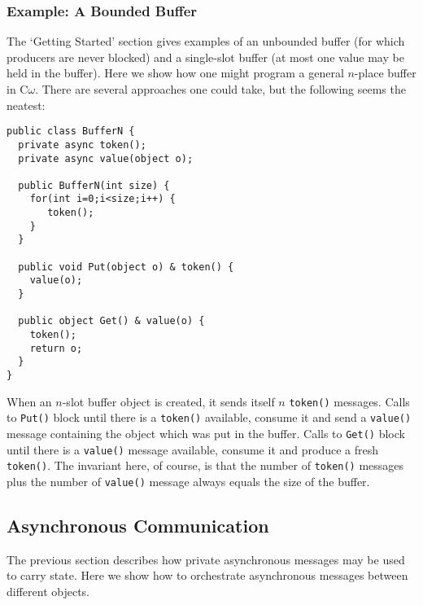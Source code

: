 \documentclass{article}
\newcommand{\comega}{\mbox{C$\omega$}}
\begin{document}
\subsubsection{Example: A Bounded Buffer}
The `Getting Started' section gives examples of an unbounded buffer
(for which producers are never blocked) and a single-slot buffer (at
most one value may be held in the buffer). Here we show how one might
program a general $n$-place buffer in \comega. There are several
approaches one could take, but the following seems the neatest:
\begin{verbatim}
public class BufferN {
  private async token();
  private async value(object o);

  public BufferN(int size) {
    for(int i=0;i<size;i++) {
       token();
    }
  }

  public void Put(object o) & token() {
    value(o);
  }

  public object Get() & value(o) {
    token();
    return o;
  }
}
\end{verbatim}
When an $n$-slot buffer object is created, it sends itself $n$
\verb|token()| messages. Calls to \verb|Put()| block until there is a
\verb|token()| available, consume it and send a \verb|value()| message
containing the object which was put in the buffer. Calls to
\verb|Get()| block until there is a \verb|value()| message available,
consume it and produce a fresh \verb|token()|. The invariant here, of
course, is that the number of \verb|token()| messages plus the number
of \verb|value()| message always equals the size of the buffer.

\subsection{Asynchronous Communication}
The previous section describes how private asynchronous messages may
be used to carry state. Here we show how to orchestrate asynchronous
messages between different objects.
\end{document}
